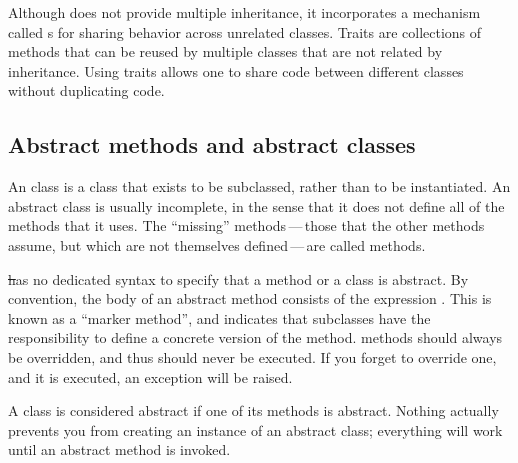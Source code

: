 \documentclass[a4paper,10pt,twoside]{book}
\begin{document}


Although \squeak does not provide multiple inheritance, it incorporates a mechanism called s for sharing behavior across unrelated classes.
Traits are collections of methods that can be reused by multiple classes that are not related by inheritance.
Using traits allows one to share code between different classes without duplicating code.

\subsection{Abstract methods and abstract classes}

An  class is a class that exists to be subclassed, rather than to be instantiated.
An abstract class is usually incomplete, in the sense that it does not define all of the methods that it uses.
The ``missing'' methods\,---\,those that the other methods assume, but which are not themselves defined\,---\,are called  methods.

\st has no dedicated syntax to specify that a method or a class is abstract.
By convention, the body of an abstract method consists of the expression \mbox{.}
This is known as a ``marker method'', and indicates that subclasses have the responsibility to define a concrete version of the method.
 methods should always be overridden, and thus should never be executed.
If you forget to override one, and it is executed, an exception will be raised.

A class is considered abstract if one of its methods is abstract.
Nothing actually prevents you from creating an instance of an abstract class; everything will work until an abstract method is invoked.
\end{document}
